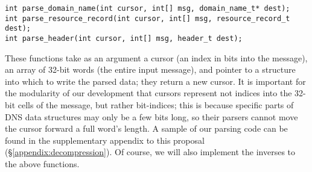 \documentclass{article}
\newcommand\Kwd[1]{{\sffamily\bfseries{#1}}}
\begin{document}
\begin{lstlisting}
int parse_domain_name(int cursor, int[] msg, domain_name_t* dest);
int parse_resource_record(int cursor, int[] msg, resource_record_t dest);
int parse_header(int cursor, int[] msg, header_t dest);
\end{lstlisting}

These functions take as an argument a cursor (an index in bits into
the message), an array of 32-bit words (the entire input message), and
pointer to a structure into which to write the parsed data; they
return a new cursor. It is important for the modularity of our
development that cursors represent not indices into the 32-bit cells
of the message, but rather bit-indices; this is because specific parts
of DNS data structures may only be a few bits long, so their parsers
cannot move the cursor forward a full word's length.
%
A sample of our parsing code can be found in the supplementary
appendix to this proposal (\S\ref{appendix:decompression}). Of
course, we will also implement the inverses to the above functions.




\end{document}
